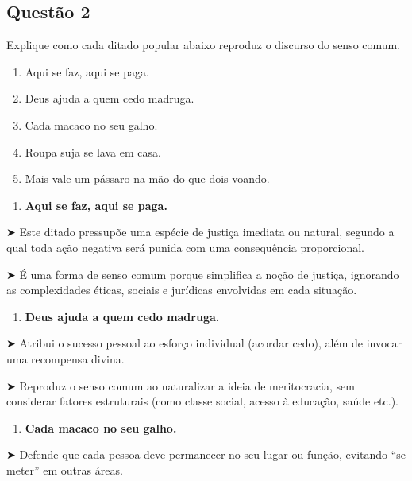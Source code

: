 \documentclass[
  letterpaper,
  DIV=11,
  numbers=noendperiod]{scrreprt}
\providecommand{\tightlist}{%
  \setlength{\itemsep}{0pt}\setlength{\parskip}{0pt}}
\begin{document}
\subsection{Questão 2}\label{questuxe3o-2-2}

Explique como cada ditado popular abaixo reproduz o discurso do senso
comum.

\begin{enumerate}
\def\labelenumi{\arabic{enumi}.}
\item
  Aqui se faz, aqui se paga.
\item
  Deus ajuda a quem cedo madruga.
\item
  Cada macaco no seu galho.
\item
  Roupa suja se lava em casa.
\item
  Mais vale um pássaro na mão do que dois voando.
\end{enumerate}

\begin{enumerate}
\def\labelenumi{\arabic{enumi}.}
\tightlist
\item
  \textbf{Aqui se faz, aqui se paga.}
\end{enumerate}

➤ Este ditado pressupõe uma espécie de justiça imediata ou natural,
segundo a qual toda ação negativa será punida com uma consequência
proporcional.

➤ É uma forma de senso comum porque simplifica a noção de justiça,
ignorando as complexidades éticas, sociais e jurídicas envolvidas em
cada situação.

\begin{enumerate}
\def\labelenumi{\arabic{enumi}.}
\setcounter{enumi}{1}
\tightlist
\item
  \textbf{Deus ajuda a quem cedo madruga.}
\end{enumerate}

➤ Atribui o sucesso pessoal ao esforço individual (acordar cedo), além
de invocar uma recompensa divina.

➤ Reproduz o senso comum ao naturalizar a ideia de meritocracia, sem
considerar fatores estruturais (como classe social, acesso à educação,
saúde etc.).

\begin{enumerate}
\def\labelenumi{\arabic{enumi}.}
\setcounter{enumi}{2}
\tightlist
\item
  \textbf{Cada macaco no seu galho.}
\end{enumerate}

➤ Defende que cada pessoa deve permanecer no seu lugar ou função,
evitando ``se meter'' em outras áreas.
\end{document}
